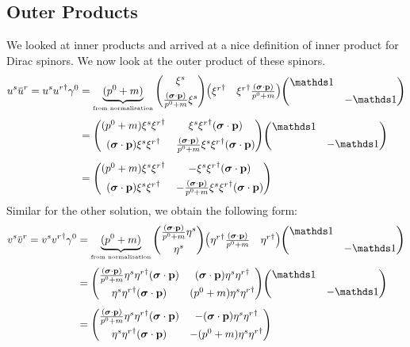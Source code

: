 \subsection{Outer Products}
We looked at inner products and arrived at a nice definition of inner product for Dirac spinors. We now look at the outer product of these spinors. 
\begin{align*}
  u^s  \dadj{u}^r  =u^s {u^r}^\dagger\gamma^0  &=\underbrace{(p^0+m)}_{\text{\tiny from normalisation}}\mqty(\xi^s \\[0.15cm] \frac{(\bs{\sigma}\cdot \vb{p})}{{p^0}+m}\xi^s)\mqty({\xi^r}^\dagger & {\xi^r}^\dagger\frac{(\bs{\sigma}\cdot \vb{p})}{{p^0}+m})\mqty(\iden & \\[0.15cm] & -\iden)  \\[0.12cm]
  &= \mqty((p^0+m)\xi^s{\xi^r}^\dagger & \xi^s{\xi^r}^\dagger {(\bs{\sigma}\cdot \vb{p})}\\[0.15cm] {(\bs{\sigma}\cdot \vb{p})}\xi^s {\xi^r}^\dagger& {\frac{(\bs{\sigma}\cdot \vb{p})}{p^0+m}}\xi^s {\xi^r}^\dagger{(\bs{\sigma}\cdot \vb{p})}  )\mqty(\iden & \\[0.15cm] & -\iden)\\[0.15cm]
  &= \mqty((p^0+m)\xi^s{\xi^r}^\dagger & -\xi^s{\xi^r}^\dagger {(\bs{\sigma}\cdot \vb{p})}\\[0.15cm] {(\bs{\sigma}\cdot \vb{p})}\xi^s {\xi^r}^\dagger& -{\frac{(\bs{\sigma}\cdot \vb{p})}{p^0+m}}\xi^s {\xi^r}^\dagger{(\bs{\sigma}\cdot \vb{p})}  )
\end{align*}
Similar for the other solution, we obtain the following form:
\begin{align*}
  v^s  \dadj{v}^r  =v^s {v^r}^\dagger\gamma^0  &=\underbrace{(p^0+m)}_{\text{\tiny from normalisation}}\mqty(\frac{(\bs{\sigma}\cdot \vb{p})}{{p^0}+m}\eta^s \\[0.15cm]\eta^s )\mqty( {\eta^r}^\dagger\frac{(\bs{\sigma}\cdot \vb{p})}{{p^0}+m} & {\eta^r}^\dagger )\mqty(\iden & \\[0.15cm] & -\iden)  \\[0.12cm]
  &= \mqty(  {\frac{(\bs{\sigma}\cdot \vb{p})}{p^0+m}}\eta^s {\eta^r}^\dagger{(\bs{\sigma}\cdot \vb{p})}       & {(\bs{\sigma}\cdot \vb{p})} \eta^s{\eta^r}^\dagger \\[0.15cm] \eta^s {\eta^r}^\dagger{(\bs{\sigma}\cdot \vb{p})}&   (p^0+m)\eta^s{\eta^r}^\dagger   )\mqty(\iden & \\[0.15cm] & -\iden)\\[0.15cm]
  &= \mqty(  {\frac{(\bs{\sigma}\cdot \vb{p})}{p^0+m}}\eta^s {\eta^r}^\dagger{(\bs{\sigma}\cdot \vb{p})}       & -{(\bs{\sigma}\cdot \vb{p})} \eta^s{\eta^r}^\dagger \\[0.15cm] \eta^s {\eta^r}^\dagger{(\bs{\sigma}\cdot \vb{p})}&   -(p^0+m)\eta^s{\eta^r}^\dagger   )
\end{align*}
